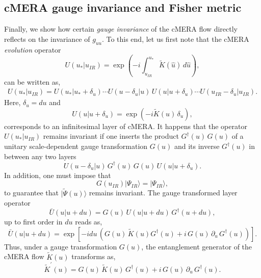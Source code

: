 \documentclass[preprint,aps]{revtex4}
\def\barray{\begin{eqnarray}}
\def\earray{\end{eqnarray}}
\def\beq{\begin{equation}}
\def\eeq{\end{equation}}
\begin{document}
\subsection*{cMERA gauge invariance and Fisher metric}
\label{gauge_CMERA}
Finally, we show how certain \textit{gauge invariance} of the cMERA flow directly reflects on the invariance of $g_{uu}$. To this end, let us first note that the cMERA \textit{evolution} operator
\beq
\label{eq3.5z}
U(u_{*}|u_{IR})=\exp\left(-i\int_{u_{IR}}^{u_{*}}\, \widetilde{K}(\hat{u})\, d\hat{u}\right),
\eeq
can be written as,
\barray
\label{eq3.6}
U(u_{*}|u_{IR}) = U(u_{*}|u_{*}+\delta_u)\cdots U(u-\delta_u|u)\, U(u|u+\delta_u)\cdots U(u_{IR}-\delta_u|u_{IR}).
\earray
Here, $\delta_u=du$ and
\beq
\label{eq3.6i}
U(u|u+\delta_u)=\exp\left( -i\widetilde{K}(u)\, \delta_u\right),
\eeq
corresponds to an infinitesimal layer of cMERA. It happens that the operator $U(u_{*}|u_{IR})$ remains invariant if one inserts the product $G^{\dagger}(u)\, G(u)$ of a unitary scale-dependent gauge transformation $G(u)$ and its inverse $G^{\dagger}(u)$ in between any two layers
\beq
\label{eq3.7}
U(u-\delta_u|u)\, G^{\dagger}(u)\, G(u)\, U(u|u+\delta_u).
\eeq
In addition, one must impose that
\beq
\label{eq3.7i}
G(u_{IR})|\Psi_{IR}\rangle =|\Psi_{IR}\rangle,
\eeq 
to guarantee that  $|\widetilde{\Psi}(u)\rangle$ remains invariant. The gauge transformed layer operator 
\beq
\label{eq3.7ii}
\bar{U}(u|u+du)= G(u)\, U(u|u+du)\, G^{\dagger}(u + du),
\eeq
up to first order in $du$ reads as,
\beq
\label{eq3.8}
\bar{U}(u|u+du)= \exp\left[ -i du\, \left(  G(u)\, \widetilde{K}(u) G^{\dagger}(u) + i\, G(u)\,\partial_u\, G^{\dagger}(u)\right)\right].
\eeq
Thus, under a gauge transformation $G(u)$, the entanglement generator of the cMERA flow $\widetilde{K}(u)$ transforms as,
\beq
\label{eq3.9}
\widetilde{K}^{'}(u) = G(u)\, \widetilde{K}(u)\, G^{\dagger}(u) + i\, G(u)\,\partial_u\, G^{\dagger}(u).
\eeq
\end{document}

